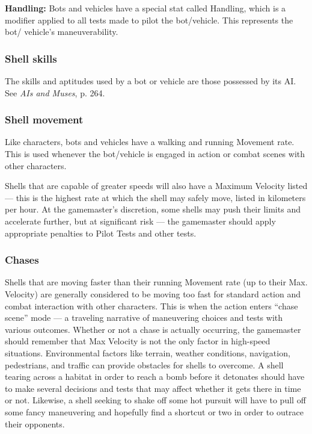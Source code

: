 \textbf{Handling:} Bots and vehicles have a special stat called Handling, which is a modifier applied to all tests made to pilot the bot/vehicle. This represents the bot/ vehicle’s maneuverability.

\subsubsection{Shell skills}

The skills and aptitudes used by a bot or vehicle are those possessed by its AI. See \emph{AIs and Muses}, p. 264.

\subsubsection{Shell movement}

Like characters, bots and vehicles have a walking and running Movement rate. This is used whenever the bot/vehicle is engaged in action or combat scenes with other characters.

Shells that are capable of greater speeds will also have a Maximum Velocity listed --- this is the highest rate at which the shell may safely move, listed in kilometers per hour. At the gamemaster’s discretion, some shells may push their limits and accelerate further, but at significant risk --- the gamemaster should apply appropriate penalties to Pilot Tests and other tests.

\subsubsection{Chases}

Shells that are moving faster than their running Movement rate (up to their Max. Velocity) are generally considered to be moving too fast for standard action and combat interaction with other characters. This is when the action enters ``chase scene'' mode --- a traveling narrative of maneuvering choices and tests with various outcomes. Whether or not a chase is actually occurring, the gamemaster should remember that Max Velocity is not the only factor in high-speed situations. Environmental factors like terrain, weather conditions, navigation, pedestrians, and traffic can provide obstacles for shells to overcome. A shell tearing across a habitat in order to reach a bomb before it detonates should have to make several decisions and tests that may affect whether it gets there in time or not. Likewise, a shell seeking to shake off some hot pursuit will have to pull off some fancy maneuvering and hopefully find a shortcut or two in order to outrace their opponents.

